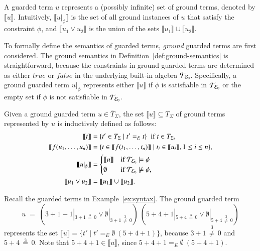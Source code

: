 A guarded term $u$ represents a (possibly infinite) set of ground
terms, denoted by $\llbracket u \rrbracket$.  Intuitively, $\llbracket
u |_\phi \rrbracket$ is the set of all ground instances of $u$ that
satisfy the constraint $\phi$, and $\llbracket u_1 \vee u_2 \rrbracket$ is the union
of the sets $\llbracket u_1 \rrbracket \cup \llbracket u_2
\rrbracket$.


To formally define the semantics of guarded terms, \emph{ground}
guarded terms are first considered.  The ground semantics in
Definition~\ref{def:ground-semantics} is straightforward, because the
constraints in ground guarded terms are determined as either
$\mathit{true}$ or $\mathit{false}$ in the underlying built-in algebra
$\mathcal{T}_{\mathcal{E}_{0}}$.  Specifically, a ground guarded term $u |_\phi$ represents
either $\llbracket u \rrbracket$ if $\phi$ is satisfiable in $\mathcal{T}_{\mathcal{E}_{0}}$
or the empty set if $\phi$ is not satisfiable in $\mathcal{T}_{\mathcal{E}_{0}}$.

\begin{definition}\label{def:ground-semantics}
Given a ground guarded term $u \in \overline{T}_{\Sigma}$,
the set $\llbracket u \rrbracket \subseteq T_\Sigma$ of  ground terms represented by $u$ 
is inductively defined as follows:
\[
\begin{aligned}
\llbracket t \rrbracket &= \{t' \in T_\Sigma \mid t' =_E t\}\;\;\mbox{if $t \in {T}_{\Sigma}$},
\\
\llbracket f(u_1,\ldots,u_n) \rrbracket &=  \{t \in \llbracket f(t_1,\ldots,t_n)\rrbracket \mid  t_i \in \llbracket u_i\rrbracket, 1 \leq i \leq n  \},
\\
\llbracket u |_\phi \rrbracket &=
    \begin{cases}
    \llbracket u \rrbracket &\mbox{if}\ \mathcal{T}_{\mathcal{E}_{0}} \models \phi 
    \\
    \emptyset &\mbox{if}\ \mathcal{T}_{\mathcal{E}_{0}} \not \models \phi,
    \end{cases}
\\
\llbracket u_1  \vee u_2  \rrbracket &= \llbracket u_1 \rrbracket \cup \llbracket u_2 \rrbracket.
\end{aligned}
\]
\end{definition}


\begin{example}\label{ex:semantics-ground}
Recall the guarded terms in Example~\ref{ex:syntax}. The ground
guarded term
\[
u \;=\; (3 + 1 + 1 |_{3 + 1 \,\stackrel{3}{=}\, 0} \vee \emptyset |_{3 + 1 \,\stackrel{3}{\not=}\, 0})\ (5 + 4 + 1 |_{5 + 4 \,\stackrel{3}{=}\, 0} \vee \emptyset |_{5 + 4 \,\stackrel{3}{\not=}\, 0})
\]
represents the set $\llbracket u \rrbracket = \{t' \mid t' =_E
\emptyset\ (5 + 4 + 1)\}$, because $ 3 + 1
\,\stackrel{\scriptscriptstyle 3}{\not=}\, 0$ and $5 + 4
\,\stackrel{\scriptscriptstyle 3}{=}\, 0$.  Note that $5 + 4 + 1 \in
\llbracket u \rrbracket$, since $5 + 4 + 1 =_E \emptyset\ (5 + 4 +
1)$.
\end{example}

